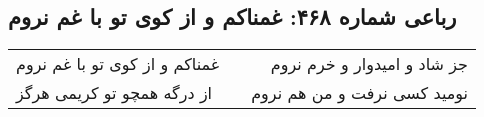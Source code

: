 \begin{center}
\section*{رباعی شماره ۴۶۸: غمناکم و از کوی تو با غم نروم}
\label{sec:sh468}
\begin{longtable}{l p{0.5cm} r}
غمناکم و از کوی تو با غم نروم
&&
جز شاد و امیدوار و خرم نروم
\\
از درگه همچو تو کریمی هرگز
&&
نومید کسی نرفت و من هم نروم
\\
\end{longtable}
\end{center}
